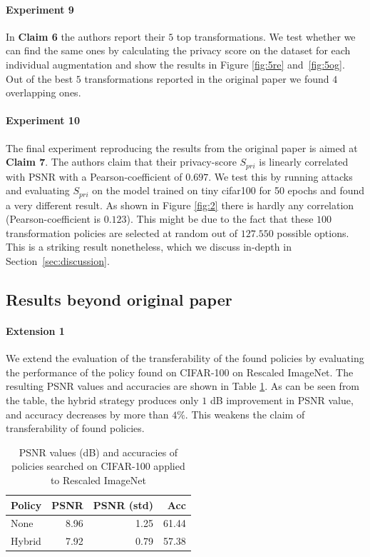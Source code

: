 \paragraph{Experiment 9} In \textbf{Claim 6} the authors report their $5$ top transformations. We test whether we can find the same ones by calculating the privacy score on the dataset for each individual augmentation and show the results in Figure \ref{fig:5re} and~\ref{fig:5og}. Out of the best $5$ transformations reported in the original paper we found $4$ overlapping ones. 

\paragraph{Experiment 10} The final experiment reproducing the results from the original paper is aimed at \textbf{Claim 7}. The authors claim that their privacy-score $S_{pri}$ is linearly correlated with PSNR with a Pearson-coefficient of $0.697$. We test this by running attacks and evaluating $S_{pri}$ on the model trained on tiny cifar100 for 50 epochs and found a very different result. As shown in Figure \ref{fig:2} there is hardly any correlation (Pearson-coefficient is $0.123$). This might be due to the fact that these $100$ transformation policies are selected at random out of $127.550$ possible options. This is a striking result nonetheless, which we discuss in-depth in Section~\ref{sec:discussion}.

\subsection{Results beyond original paper}

\paragraph{Extension 1} We extend the evaluation of the transferability of the found policies by evaluating the performance of the policy found on CIFAR-100 on Rescaled ImageNet. The resulting PSNR values and accuracies are shown in Table \ref{tab:ext1}. As can be seen from the table, the hybrid strategy produces only $1$ dB improvement in PSNR value, and accuracy decreases by more than $4\%$. This weakens the claim of transferability of found policies.

\begin{table}[htb]
    \centering
    \begin{tabular}{lrrr}
        \hline
         Policy   &   PSNR &   PSNR (std) &   Acc \\
        \hline
         None     &        8.96 &       1.25 & 61.44 \\
         Hybrid   &        7.92 &       0.79 & 57.38 \\
        \hline
    \end{tabular}
    \caption{PSNR values (dB) and accuracies of policies searched on CIFAR-100 applied to Rescaled ImageNet}
    \label{tab:ext1}
\end{table}

